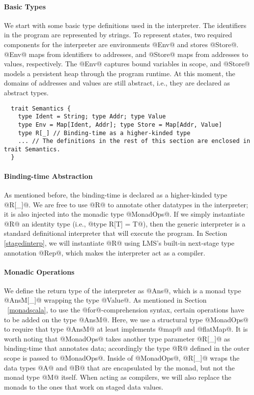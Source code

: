 \paragraph{Basic Types} We start with some basic type definitions used in the
interpreter. The identifiers in the program are represented by
strings. To represent states, two required components for the
interpreter are environments @Env@ and stores @Store@. @Env@ maps from
identifiers to addresses, and @Store@ maps from addresses to values,
respectively. The @Env@ captures bound variables in scope, and @Store@
models a persistent heap through the program runtime.  At this moment,
the domains of addresses and values are still abstract, i.e., they are
declared as abstract types.
\begin{lstlisting}
  trait Semantics {
    type Ident = String; type Addr; type Value
    type Env = Map[Ident, Addr]; type Store = Map[Addr, Value]
    type R[_] // Binding-time as a higher-kinded type
    ... // The definitions in the rest of this section are enclosed in trait Semantics.
  }
\end{lstlisting}

\paragraph{Binding-time Abstraction} As mentioned before, the binding-time is
declared as a higher-kinded type @R[_]@. We are free to use @R@ to annotate
other datatypes in the interpreter; it is also injected into the monadic
type @MonadOps@.
If we simply instantiate @R@ an identity type (i.e., @type R[T] = T@),
then the generic interpreter is a standard definitional interpreter
that will execute the program.  In Section \ref{stagedinterp}, we will
instantiate @R@ using LMS's built-in next-stage type annotation @Rep@,
which makes the interpreter act as a compiler.

\paragraph{Monadic Operations} We define the return type of the interpreter as
@Ans@, which is a monad type @AnsM[_]@ wrapping the type @Value@. 
As mentioned in Section ~\ref{monadscala}, to use the @for@-comprehension
syntax, certain operations have to be added on the type @AnsM@. Here, we use a
structural type @MonadOps@ to require that type @AnsM@ at least implements @map@ and
@flatMap@. It is worth noting that @MonadOps@ takes another type parameter
@R[_]@ as binding-time that annotates data; accordingly the type @R@
defined in the outer scope is passed to @MonadOps@. Inside of @MonadOps@,
@R[_]@ wraps the data types @A@ and @B@ that are encapsulated by the
monad, but not the monad type @M@ itself. When acting as compilers, we
will also replace the monads to the ones that work on staged data values.

